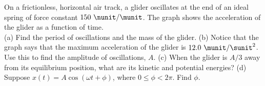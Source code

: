On a frictionless, horizontal air track, a glider oscillates at the
end of an ideal spring of force constant $150\ \nunit/\munit$. The
graph shows the acceleration of the glider as a function of time.\\
%
(a) Find the period of oscillations and the mass of the glider.\answercheck\hwendpart
%
(b) Notice that the graph says that the maximum acceleration of the glider
is $12.0\ \munit/\sunit^2$. Use this to find the amplitude of
oscillations, $A$.\answercheck\hwendpart
%
(c) When the glider is $A/3$ away from its equilibrium position,
what are its kinetic and potential energies?\answercheck\hwendpart
%
(d) Suppose $x(t) = A \cos(\omega t + \phi)$, where $0\le \phi < 2\pi$. Find $\phi$.\answercheck
